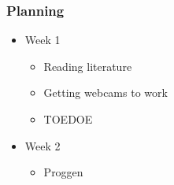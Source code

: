 \documentclass{beamer}
\begin{document}
\frame
{
  \frametitle{Planning}
  \begin{itemize}

    \item Week 1
      \begin{itemize}
        \item Reading literature
        \item Getting webcams to work
        \item TOEDOE
      \end{itemize}
    \item Week 2
      \begin{itemize}
        \item Proggen

      \end{itemize}
  \end{itemize}
}
\end{document}

